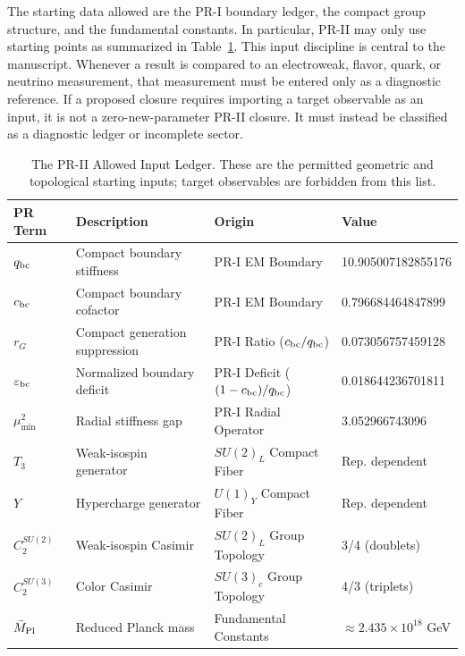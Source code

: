 \documentclass[11pt]{article}
\renewcommand{\arraystretch}{1.22}
\renewcommand{\arraystretch}{1.4}
\begin{document}
 The starting data allowed are the PR-I boundary ledger, the compact group structure, and the fundamental constants. In particular, PR-II may only use starting points as summarized in Table~\ref{tab:allowed_inputs}. This input discipline is central to the manuscript. Whenever a result is compared to an electroweak, flavor, quark, or neutrino measurement, that measurement must be entered only as a diagnostic reference. If a proposed closure requires importing a target observable as an input, it is not a zero-new-parameter PR-II closure. It must instead be classified as a diagnostic ledger or incomplete sector.

\begin{table}[ht]
\centering
\caption{The PR-II Allowed Input Ledger. These are the permitted geometric and topological starting inputs; target observables are forbidden from this list.}
\renewcommand{\arraystretch}{1.4}
\begin{tabular}{llll}
\hline\hline
\textbf{PR Term} & \textbf{Description} & \textbf{Origin} & \textbf{Value} \\
\hline
\(q_{\rm bc}\) & Compact boundary stiffness & PR-I EM Boundary & 10.905007182855176 \\
\(c_{\rm bc}\) & Compact boundary cofactor & PR-I EM Boundary & 0.796684464847899 \\
\(r_G\) & Compact generation suppression & PR-I Ratio (\(c_{\rm bc}/q_{\rm bc}\)) & 0.073056757459128\\
\(\varepsilon_{\rm bc}\) & Normalized boundary deficit & PR-I Deficit (\((1-c_{\rm bc})/q_{\rm bc}\)) & 0.018644236701811 \\
\(\mu_{\min}^2\) & Radial stiffness gap & PR-I Radial Operator & 3.052966743096\\
\(T_3\) & Weak-isospin generator & \(SU(2)_L\) Compact Fiber & Rep. dependent \\
\(Y\) & Hypercharge generator & \(U(1)_Y\) Compact Fiber & Rep. dependent \\
\(C_2^{SU(2)}\) & Weak-isospin Casimir & \(SU(2)_L\) Group Topology & 3/4 (doublets) \\
\(C_2^{SU(3)}\) & Color Casimir & \(SU(3)_c\) Group Topology & 4/3 (triplets) \\
\(\bar{M}_{\rm Pl}\) & Reduced Planck mass & Fundamental Constants & \(\approx 2.435 \times 10^{18}\) GeV \\
\hline\hline
\end{tabular}
\label{tab:allowed_inputs}
\end{table}
\end{document}
